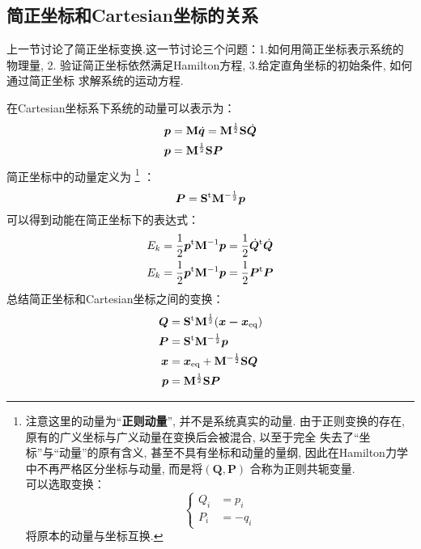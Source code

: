     \subsection{简正坐标和Cartesian坐标的关系}
    上一节讨论了简正坐标变换.这一节讨论三个问题：1.如何用简正坐标表示系统的物理量, 2.
    验证简正坐标依然满足Hamilton方程, 3.给定直角坐标的初始条件, 如何通过简正坐标
    求解系统的运动方程.

    \splitline

    在Cartesian坐标系下系统的动量可以表示为：
    \begin{equation}
        \begin{split}
        \bm{p} &= \mathbf{M}\dot{\bm{q}} = \mathbf{M}^{\frac 12} \mathbf{S}\dot{\bm{Q}}\\
        \bm{p} &= \mathbf{M}^{\frac{1}{2}}\mathbf{S}\bm{P}
        \end{split}
    \end{equation}
    简正坐标中的动量定义为
    \footnote{
        注意这里的动量为“\textbf{正则动量}”, 并不是系统真实的动量.
        由于正则变换的存在, 原有的广义坐标与广义动量在变换后会被混合, 以至于完全
        失去了“坐标”与“动量”的原有含义, 甚至不具有坐标和动量的量纲, 
        因此在Hamilton力学中不再严格区分坐标与动量, 而是将$(\bm{Q}, \bm{P})$
        合称为正则共轭变量.\\
        可以选取变换：
        \begin{equation}
            \left\{
                \begin{split}
                    Q_{i} &= p_i\\
                    P_{i} &= -q_i
                \end{split}
            \right.
        \end{equation}
        将原本的动量与坐标互换.
    }
    ：
    \begin{equation}
        \bm{P} = \mathbf{S}^{\mathrm{t}} \mathbf{M}^{-\frac 12} \bm{p}
    \end{equation}
    可以得到动能在简正坐标下的表达式：
    \begin{equation}
        \begin{split}
        E_{k} &= \frac{1}{2}\bm{p}^{\mathrm{t}}\mathbf{M}^{-1}\bm{p} = \frac{1}{2}\dot{\bm{Q}}^{\mathrm{t}}\dot{\bm{Q}}\\
        E_{k} &= \frac{1}{2}\bm{p}^{\mathrm{t}}\mathbf{M}^{-1}\bm{p} = \frac{1}{2}\bm{P}^{\mathrm{t}}\bm{P}
        \end{split}
    \end{equation}
    总结简正坐标和Cartesian坐标之间的变换：
    \begin{equation}
        \begin{aligned}
        \bm{Q} &= \mathbf{S}^\mathrm{t} \mathbf{M}^{\frac 12} (\bm{x-x}_\mathrm{eq})\\
        \bm{P} &= \mathbf{S}^\mathrm{t} \mathbf{M}^{-\frac 12} \bm{p}\\
        \bm{x} &= \bm{x}_\mathrm{eq} + \mathbf{M}^{-\frac 12}\mathbf{S}\bm{Q}\\
        \bm{p} &= \mathbf{M}^{\frac 12}\mathbf{S}\bm{P}
        \end{aligned}
        \label{normal mode and cartesian coordinate}
    \end{equation}

